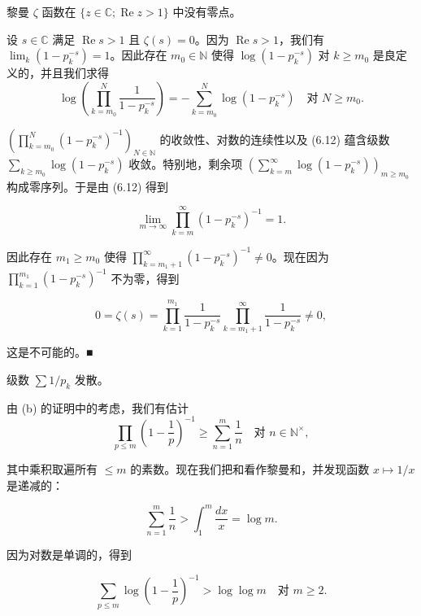 \begin{remark}
\begin{items}
黎曼 $ \zeta $ 函数在 $ \{ z \in \mathbb{C} ; \operatorname{Re} z > 1 \} $ 中没有零点。

\proofhead
设 $ s \in \mathbb{C} $ 满足 $ \operatorname{Re} s > 1 $ 且 $ \zeta(s) = 0 $。因为 $ \operatorname{Re} s > 1 $，我们有 $ \lim_k(1 - p_k^{-s}) = 1 $。因此存在 $ m_0 \in \mathbb{N} $ 使得 $ \log(1 - p_k^{-s}) $ 对 $ k \ge m_0 $ 是良定义的，并且我们求得
\begin{equation}
\log\left( \prod_{k=m_0}^{N}\frac{1}{1 - p_k^{-s}} \right) = -\sum_{k=m_0}^{N}\log(1 - p_k^{-s}) \quad \text{对 } N \ge m_0 .\tag{6.12}
\end{equation}

$ \left(\prod_{k=m_0}^{N}(1 - p_k^{-s})^{-1}\right)_{N\in\mathbb{N}} $ 的收敛性、对数的连续性以及 (6.12) 蕴含级数 $ \sum_{k\ge m_0}\log(1 - p_k^{-s}) $ 收敛。特别地，剩余项 $ \left(\sum_{k=m}^{\infty}\log(1 - p_k^{-s})\right)_{m\ge m_0} $ 构成零序列。于是由 (6.12) 得到

\[
\lim_{m\to\infty}\prod_{k=m}^{\infty}(1 - p_k^{-s})^{-1} = 1 .
\]

因此存在 $ m_1 \ge m_0 $ 使得 $ \prod_{k=m_1+1}^{\infty}(1 - p_k^{-s})^{-1} \ne 0 $。现在因为 $ \prod_{k=1}^{m_1}(1 - p_k^{-s})^{-1} $ 不为零，得到

\[
0 = \zeta(s) = \prod_{k=1}^{m_1}\frac{1}{1 - p_k^{-s}}\prod_{k=m_1+1}^{\infty}\frac{1}{1 - p_k^{-s}} \ne 0 ,
\]

这是不可能的。\nobreak\hspace{0.35em}■

\item

级数 $ \sum 1/p_k $ 发散。

\proofhead
由 (b) 的证明中的考虑，我们有估计
\[
\prod_{p\le m}\left( 1 - \frac{1}{p} \right)^{-1} \ge \sum_{n=1}^{m}\frac{1}{n} \quad \text{对 } n \in \mathbb{N}^\times ,
\]

其中乘积取遍所有 $ \le m $ 的素数。现在我们把和看作黎曼和，并发现函数 $ x \mapsto 1/x $ 是递减的：

\end{items}

\[
\sum_{n=1}^{m}\frac{1}{n} > \int_1^m \frac{dx}{x} = \log m .
\]

因为对数是单调的，得到

\begin{equation}
\sum_{p\le m}\log\left( 1 - \frac{1}{p} \right)^{-1} > \log\log m \quad \text{对 } m \ge 2 .\tag{6.13}
\end{equation}


\end{remark}
